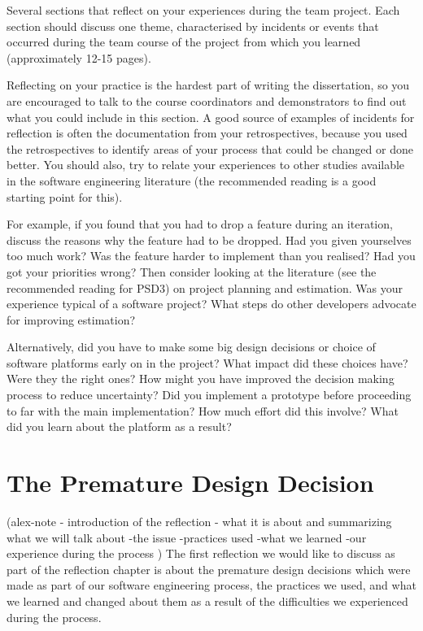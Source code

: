 \documentclass{l3proj}
\begin{document}
Several sections that reflect on your experiences during the team project. Each section should discuss one theme, characterised by incidents or events that occurred during the team course of the project from which you learned (approximately 12-15 pages).

Reflecting on your practice is the hardest part of writing the dissertation, so you are encouraged to talk to the course coordinators and demonstrators to find out what you could include in this section. A good source of examples of incidents for reflection is often the documentation from your retrospectives, because you used the retrospectives to identify areas of your process that could be changed or done better. You should also, try to relate your experiences to other studies available in the software engineering literature (the recommended reading is a good starting point for this).

For example, if you found that you had to drop a feature during an iteration, discuss the reasons why the feature had to be dropped. Had you given yourselves too much work? Was the feature harder to implement than you realised? Had you got your priorities wrong? Then consider looking at the literature (see the recommended reading for PSD3) on project planning and estimation. Was your experience typical of a software project? What steps do other developers advocate for improving estimation?

Alternatively, did you have to make some big design decisions or choice of software platforms early on in the project? What impact did these choices have? Were they the right ones? How might you have improved the decision making process to reduce uncertainty? Did you implement a prototype before proceeding to far with the main implementation? How much effort did this involve? What did you learn about the platform as a result?

\section{The Premature Design Decision}
\label{design}

(alex-note - introduction of the reflection - what it is about and summarizing what we will talk about
-the issue
-practices used
-what we learned
-our experience during the process
)
The first reflection we would like to discuss as part of the reflection chapter is about the premature design decisions which were made as part of our software engineering process, the practices we used, and what we learned and changed about them as a result of the difficulties we experienced during the process.
\end{document}
